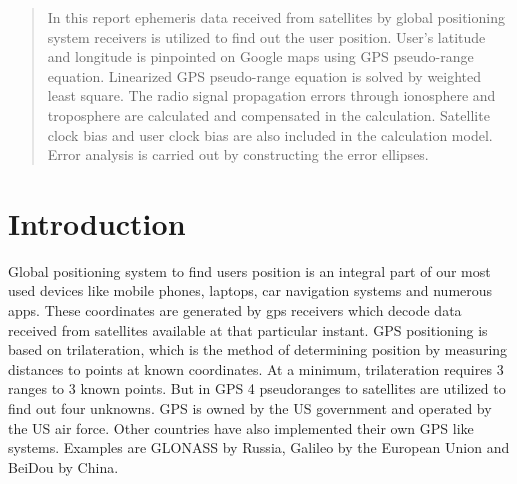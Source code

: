 \documentclass[conference,compsoc]{IEEEtran}
\begin{document}
\maketitle

\begin{abstract}
In this report ephemeris data received from satellites by global positioning system receivers is utilized to find out the user position. User's latitude and longitude is pinpointed on Google maps using GPS pseudo-range equation. Linearized GPS pseudo-range equation is solved by weighted least square. The radio signal propagation errors through ionosphere and troposphere are calculated and compensated in the calculation. Satellite clock bias and user clock bias are also included in the calculation model. Error analysis is carried out by constructing the error ellipses. 
\end{abstract}




%
\IEEEpeerreviewmaketitle



\section{Introduction}
Global positioning system to find users position is an integral part of our most used devices like mobile phones, laptops, car navigation systems and numerous apps. These coordinates are generated by gps receivers which decode data received from satellites available at that particular instant. GPS positioning is based on trilateration, which is the method of determining position by measuring distances to points at known coordinates. At a minimum, trilateration requires 3 ranges to 3 known points. But in GPS 4 pseudoranges to satellites are utilized to find out four unknowns.
GPS is owned by the US government and operated by the US air force. Other countries have also implemented their own GPS like systems. Examples are GLONASS by Russia, Galileo by the European Union and BeiDou by China.
\end{document}
